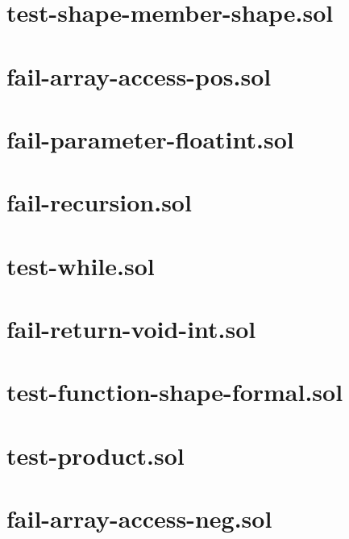\section{test-shape-member-shape.sol}


\section{fail-array-access-pos.sol}


\section{fail-parameter-floatint.sol}


\section{fail-recursion.sol}


\section{test-while.sol}


\section{fail-return-void-int.sol}


\section{test-function-shape-formal.sol}


\section{test-product.sol}


\section{fail-array-access-neg.sol}


